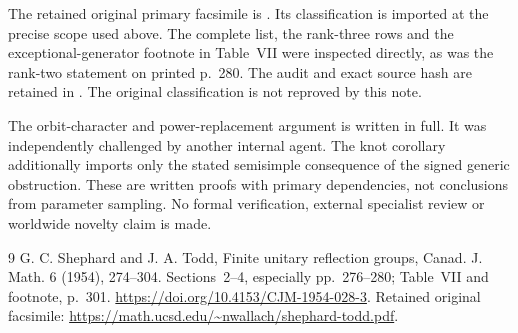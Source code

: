 \documentclass[11pt]{article}
\begin{document}
The retained original primary facsimile is
.
Its classification is imported at the precise scope used above.
The complete list, the rank-three rows and the exceptional-generator
footnote in Table~VII were inspected directly, as was the rank-two
statement on printed p.~280. The audit and exact source hash are retained
in .
The original classification is not reproved by this note.

The orbit-character and power-replacement argument is written in full.
It was independently challenged by another internal agent.
The knot corollary additionally imports only the stated semisimple
consequence of the signed generic obstruction.
These are written proofs with primary dependencies, not conclusions
from parameter sampling. No formal verification, external specialist
review or worldwide novelty claim is made.

\begin{thebibliography}{9}
G. C. Shephard and J. A. Todd,
Finite unitary reflection groups,
Canad. J. Math. 6 (1954), 274--304.
Sections~2--4, especially pp.~276--280;
Table~VII and footnote, p.~301.
\url{https://doi.org/10.4153/CJM-1954-028-3}.
Retained original facsimile:
\url{https://math.ucsd.edu/~nwallach/shephard-todd.pdf}.
\end{thebibliography}
\end{document}
